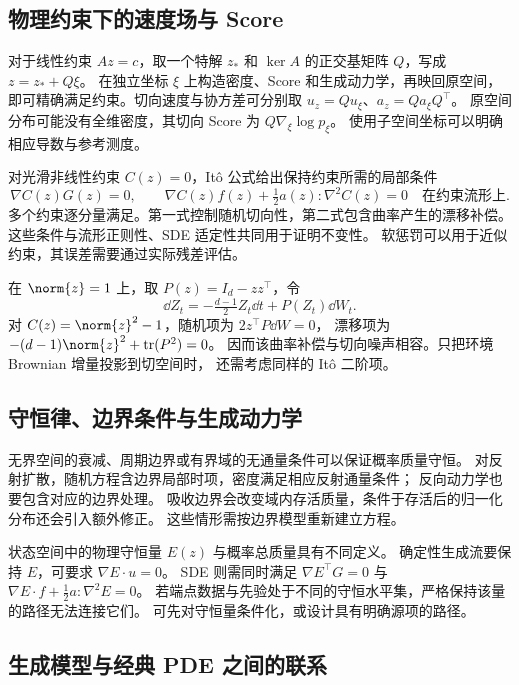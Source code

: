 \subsection{物理约束下的速度场与 Score}

对于线性约束 \(Az=c\)，取一个特解 \(z_*\) 和
\(\ker A\) 的正交基矩阵 \(Q\)，写成 \(z=z_*+Q\xi\)。
在独立坐标 \(\xi\) 上构造密度、Score 和生成动力学，再映回原空间，
即可精确满足约束。切向速度与协方差可分别取
\(u_z=Qu_\xi\)、\(a_z=Qa_\xi Q^\top\)。
原空间分布可能没有全维密度，其切向 Score 为 \(Q\nabla_\xi\log p_\xi\)。
使用子空间坐标可以明确相应导数与参考测度。

对光滑非线性约束 \(C(z)=0\)，It\^o 公式给出保持约束所需的局部条件
\begin{equation}
 \nabla C(z)G(z)=0,\qquad
 \nabla C(z)f(z)+\tfrac12 a(z):\nabla^2 C(z)=0
 \quad\text{在约束流形上}.
 \label{eq:unified-nonlinear-constraint}
\end{equation}
多个约束逐分量满足。第一式控制随机切向性，第二式包含曲率产生的漂移补偿。
这些条件与流形正则性、SDE 适定性共同用于证明不变性。
软惩罚可以用于近似约束，其误差需要通过实际残差评估。

\begin{example}
在 \(\norm{z}=1\) 上，取 \(P(z)=I_d-zz^\top\)，令
\[
 \dd Z_t=-\tfrac{d-1}{2}Z_t\dd t+P(Z_t)\dd W_t.
\]
对 \(C(z)=\norm{z}^2-1\)，随机项为 \(2z^\top P\dd W=0\)，
漂移项为 \(-(d-1)\norm{z}^2+\operatorname{tr}(P^2)=0\)。
因而该曲率补偿与切向噪声相容。只把环境 Brownian 增量投影到切空间时，
还需考虑同样的 It\^o 二阶项。
\end{example}

\subsection{守恒律、边界条件与生成动力学}

无界空间的衰减、周期边界或有界域的无通量条件可以保证概率质量守恒。
对反射扩散，随机方程含边界局部时项，密度满足相应反射通量条件；
反向动力学也要包含对应的边界处理。
吸收边界会改变域内存活质量，条件于存活后的归一化分布还会引入额外修正。
这些情形需按边界模型重新建立方程。

状态空间中的物理守恒量 \(E(z)\) 与概率总质量具有不同定义。
确定性生成流要保持 \(E\)，可要求 \(\nabla E\cdot u=0\)。
SDE 则需同时满足
\(\nabla E^\top G=0\) 与
\(\nabla E\cdot f+\frac12a:\nabla^2E=0\)。
若端点数据与先验处于不同的守恒水平集，严格保持该量的路径无法连接它们。
可先对守恒量条件化，或设计具有明确源项的路径。

\subsection{生成模型与经典 PDE 之间的联系}

